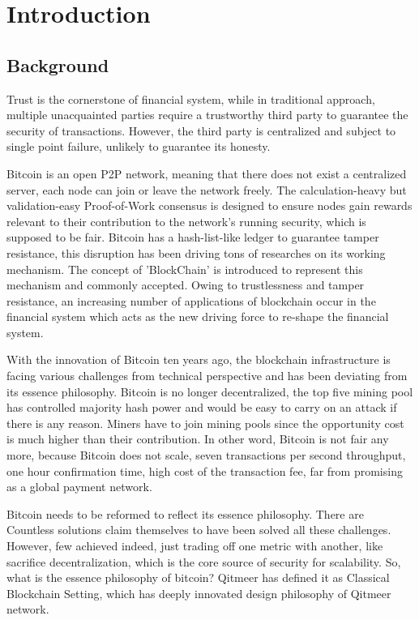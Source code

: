\documentclass[a4paper,11pt]{article}
\begin{document}
\section{Introduction}

\subsection{Background}
Trust is the cornerstone of financial system, while in traditional approach, multiple unacquainted parties require a trustworthy third party to guarantee the security of transactions. However, the third party is centralized and subject to single point failure, unlikely to guarantee its honesty.

Bitcoin is an open P2P network, meaning that there does not exist a centralized server, each node can join or leave the network freely. The calculation-heavy but validation-easy Proof-of-Work consensus is designed to ensure nodes gain rewards relevant to their contribution to the network’s running security, which is supposed to be fair. Bitcoin has a hash-list-like ledger to guarantee tamper resistance, this disruption has been driving tons of researches on its working mechanism. The concept of ’BlockChain’ is introduced to represent this mechanism and commonly accepted. Owing to trustlessness and tamper resistance, an increasing number of applications of blockchain occur in the financial system which acts as the new driving force to re-shape the financial system.

With the innovation of Bitcoin ten years ago, the blockchain infrastructure is facing various challenges from technical perspective and has been deviating from its essence philosophy. Bitcoin is no longer decentralized, the top five mining pool has controlled majority hash power and would be easy to carry on an attack if there is any reason. Miners have to join mining pools since the opportunity cost is much higher than their contribution. In other word, Bitcoin is not fair any more, because Bitcoin does not scale, seven transactions per second throughput, one hour confirmation time, high cost of the transaction fee, far from promising as a global payment network.

Bitcoin needs to be reformed to reflect its essence philosophy. There are Countless solutions claim themselves to have been solved all these challenges. However, few achieved indeed, just trading off one metric with another, like sacrifice decentralization, which is the core source of security for scalability. So, what is the essence philosophy of bitcoin? Qitmeer has defined it as Classical Blockchain Setting, which has deeply innovated design philosophy of Qitmeer network.
\end{document}
